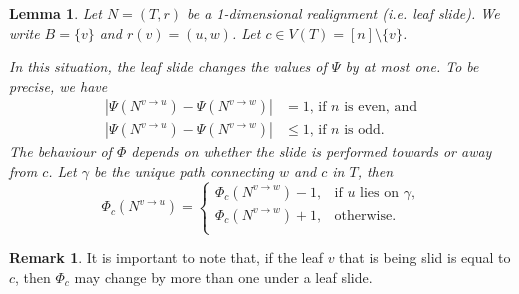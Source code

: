 \documentclass[reqno,dvipsnames]{amsart}
\theoremstyle{plain}
\newtheorem{lemma}[theorem]{Lemma}
\numberwithin{equation}{section}
\theoremstyle{definition}
\newtheorem{remark}[theorem]{Remark}
\begin{document}
\begin{lemma}\label{iter}
	Let $N = (T,r)$ be a 1-dimensional realignment (i.e. leaf slide). We write $B = \{v\}$ and  $r(v) = (u,w)$. Let $c\in V(T) = [n]\setminus\{v\}$.

	In this situation, the leaf slide changes the values of $\Psi$ by at most one. To be precise, we have
	\begin{equation}\label{Psiiter}
		\begin{split}
			|\Psi(N^{v\to u})-\Psi(N^{v\to w})|&  = 1\text{, if $n$ is even, and}\\
			|\Psi(N^{v\to u})-\Psi(N^{v\to w})|&  \leq 1\text{, if $n$ is odd.}
		\end{split}
	\end{equation}
	The behaviour of $\Phi$ depends on whether the slide is performed towards or away from $c$. Let $\gamma$ be the unique path connecting $w$ and $c$ in $T$, then
	\begin{equation}\label{Phiiter}
		\Phi_c(N^{v\to u}) = 
		\begin{cases}
			\Phi_c(N^{v\to w}) - 1, &\text{if $u$ lies on $\gamma$,}\\
			\Phi_c(N^{v\to w}) + 1, &\text{otherwise.}\\
		\end{cases}
	\end{equation}
\end{lemma} 

\begin{remark}
	It is important to note that, if the leaf $v$ that is being slid is equal to $c$, then $\Phi_c$ may change by more than one under a leaf slide.
\end{remark}
\end{document}
